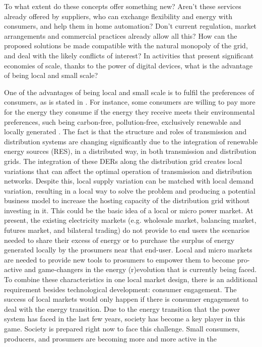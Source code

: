 \begin{tcolorbox}
To what extent do these concepts offer something new? Aren't these services already offered by suppliers, who can exchange flexibility and energy with consumers, and help them in home automation? Don't current regulation, market arrangements and commercial
practices already allow all this? How can the proposed solutions be made compatible with the natural monopoly of the grid, and deal with the likely conflicts of interest? In activities that present significant economies of scale, thanks to the power of digital devices, what is the advantage of being local and small scale?
\end{tcolorbox}

One of the advantages of being local and small scale is to fulfil the preferences of consumers, as is stated in \cite{faber2014micro}. For instance, some consumers are willing to pay more for the energy they consume if the energy they receive meets their environmental preferences, such being carbon-free, pollution-free, exclusively renewable and locally generated \cite{lane2013costing}. The fact is that the structure and roles of transmission and distribution systems are changing significantly due to the integration of renewable energy sources (RES), in a distributed way, in both transmission and distribution grids. The integration of these DERs along the distribution grid creates local variations that can affect the optimal operation of transmission and distribution networks. Despite this, local supply variation
can be matched with local demand variation, resulting in a local way to solve the problem \cite{mengelkamp2018designing} and producing a potential business model to increase the hosting capacity of the distribution grid without investing in it. This could be the basic idea of a local or micro power market. At present, the existing electricity markets (e.g. wholesale market, balancing market, futures market, and bilateral trading) do not provide to end users the scenarios needed to share their excess of energy or to purchase the surplus of  energy generated locally by the prosumers near that end-user. Local and micro markets are needed to provide new tools to prosumers to empower them to become pro-active and game-changers in the energy (r)evolution that is currently being faced. To combine these characteristics in one local market design, there is an additional requirement besides technological development: consumer engagement. The success of local markets would only happen if there is consumer engagement to deal with the energy transition. Due to the energy transition that the power system has faced in the last few years, society has become a key player in this game. Society is prepared right now to face this challenge. Small consumers, producers, and prosumers are becoming more and more active in the
